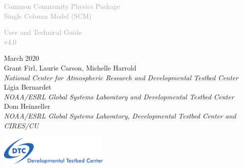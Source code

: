 \begin{titlepage}
\renewcommand{\thefootnote}{\fnsymbol{footnote}}

\vspace*{1em}
\noindent

\begin{center}
\textcolor{darkgray}{\bigsf Common Community Physics Package\\[0.5ex] Single Column Model (SCM)}
\vspace*{1em}\par

\textcolor{darkgray}{\bigst User and Technical Guide\\[0.5ex] v4.0}
\vspace*{1em}\par

\large{March 2020}\\

Grant Firl, Laurie Carson, Michelle Harrold\\
\textit{\small{National Center for Atmospheric Research and Developmental Testbed Center}}\\[4em]

Ligia Bernardet\\
\textit{\small{NOAA/ESRL Global Systems Laboratory and Developmental Testbed Center}}\\[4em]

Dom Heinzeller\\
\textit{\small{NOAA/ESRL Global Systems Laboratory, Developmental Testbed Center and CIRES/CU}}\\[4em]

\vspace{4em}

\includegraphics[width=0.4\textwidth]{images/dtc_logo.png}\\[2em]

\end{center}
\end{titlepage}
\pagebreak{}
